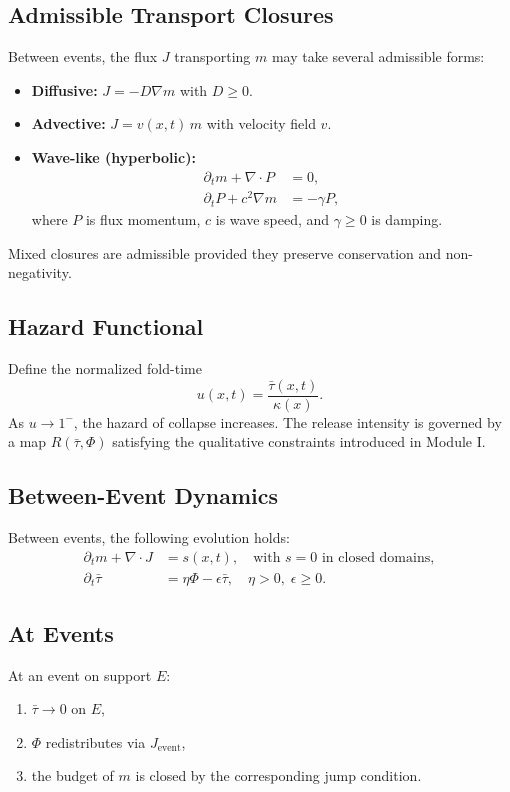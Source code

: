 \documentclass[11pt]{article}
\begin{document}
\subsection{Admissible Transport Closures}
Between events, the flux $J$ transporting $m$ may take several admissible forms:
\begin{itemize}[leftmargin=*]
    \item \textbf{Diffusive:} $J = -D \nabla m$ with $D \geq 0$.
    \item \textbf{Advective:} $J = v(x,t)\, m$ with velocity field $v$.
    \item \textbf{Wave-like (hyperbolic):}
    \begin{align*}
        \partial_t m + \nabla \cdot P &= 0, \\
        \partial_t P + c^2 \nabla m &= -\gamma P,
    \end{align*}
    where $P$ is flux momentum, $c$ is wave speed, and $\gamma \geq 0$ is damping.
\end{itemize}
Mixed closures are admissible provided they preserve conservation and non-negativity.

\subsection{Hazard Functional}
Define the normalized fold-time
\[
u(x,t) = \frac{\bar{\tau}(x,t)}{\kappa(x)}.
\]
As $u \to 1^-$, the hazard of collapse increases. The release intensity is governed by a map $R(\bar{\tau}, \Phi)$ satisfying the qualitative constraints introduced in Module I.

\subsection{Between-Event Dynamics}
Between events, the following evolution holds:
\begin{align*}
    \partial_t m + \nabla \cdot J &= s(x,t), \quad \text{with } s=0 \text{ in closed domains}, \\
    \partial_t \bar{\tau} &= \eta \Phi - \epsilon \bar{\tau}, \quad \eta > 0, \; \epsilon \geq 0.
\end{align*}

\subsection{At Events}
At an event on support $E$:
\begin{enumerate}[leftmargin=*]
    \item $\bar{\tau} \to 0$ on $E$,
    \item $\Phi$ redistributes via $J_{\text{event}}$,
    \item the budget of $m$ is closed by the corresponding jump condition.
\end{enumerate}
\end{document}
